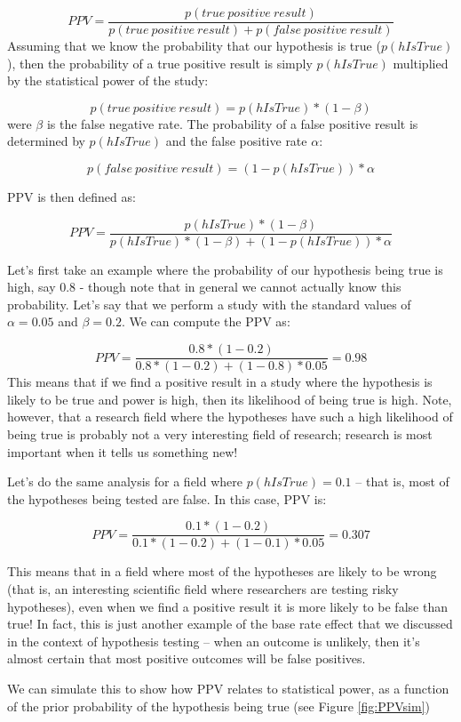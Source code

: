 \documentclass[12pt,]{book}
\theoremstyle{definition}
\theoremstyle{definition}
\theoremstyle{definition}
\theoremstyle{remark}
\begin{document}
\[
PPV = \frac{p(true\ positive\ result)}{p(true\ positive\ result) + p(false\ positive\ result)}
\]
Assuming that we know the probability that our hypothesis is true (\(p(hIsTrue)\)), then the probability of a true positive result is simply \(p(hIsTrue)\) multiplied by the statistical power of the study:

\[
p(true\ positive\ result) = p(hIsTrue) * (1 - \beta)
\]
were \(\beta\) is the false negative rate. The probability of a false positive result is determined by \(p(hIsTrue)\) and the false positive rate \(\alpha\):

\[
p(false\ positive\ result) = (1 - p(hIsTrue)) * \alpha
\]

PPV is then defined as:

\[
PPV = \frac{p(hIsTrue) * (1 - \beta)}{p(hIsTrue) * (1 - \beta) + (1 - p(hIsTrue)) * \alpha}
\]

Let's first take an example where the probability of our hypothesis being true is high, say 0.8 - though note that in general we cannot actually know this probability. Let's say that we perform a study with the standard values of \(\alpha=0.05\) and \(\beta=0.2\). We can compute the PPV as:

\[
PPV = \frac{0.8 * (1 - 0.2)}{0.8 * (1 - 0.2) + (1 - 0.8) * 0.05} = 0.98
\]
This means that if we find a positive result in a study where the hypothesis is likely to be true and power is high, then its likelihood of being true is high. Note, however, that a research field where the hypotheses have such a high likelihood of being true is probably not a very interesting field of research; research is most important when it tells us something new!

Let's do the same analysis for a field where \(p(hIsTrue)=0.1\) -- that is, most of the hypotheses being tested are false. In this case, PPV is:

\[
PPV = \frac{0.1 * (1 - 0.2)}{0.1 * (1 - 0.2) + (1 - 0.1) * 0.05} = 0.307
\]

This means that in a field where most of the hypotheses are likely to be wrong (that is, an interesting scientific field where researchers are testing risky hypotheses), even when we find a positive result it is more likely to be false than true! In fact, this is just another example of the base rate effect that we discussed in the context of hypothesis testing -- when an outcome is unlikely, then it's almost certain that most positive outcomes will be false positives.

We can simulate this to show how PPV relates to statistical power, as a function of the prior probability of the hypothesis being true (see Figure \ref{fig:PPVsim})
\end{document}
